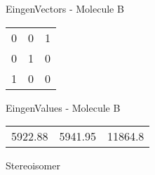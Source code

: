\begin{multicols}{2}
\begin{center}
\vtab
 EingenVectors - Molecule B     \\
\vtab
\begin{tabular}{|c c c|}
0	 & 	0	 & 	1	 \\
0	 & 	1	 & 	0	 \\
1	 & 	0	 & 	0
\end{tabular}

\vtab
 EingenValues - Molecule B     \\
\vtab
\begin{tabular}{|c c c|}
5922.88	 & 	5941.95	 & 	11864.8	 \\
\end{tabular}

\end{center}
\end{multicols}
\begin{center}
\vtab
\vtab
\textcolor{NavyBlue}{\Large Stereoisomer}
\end{center}

 \newpage

